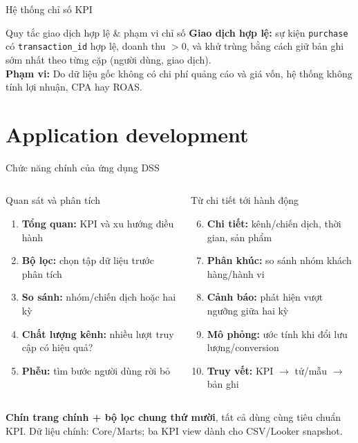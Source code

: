 \documentclass[aspectratio=169]{beamer}
\begin{document}
\begin{frame}{Hệ thống chỉ số KPI}
  \begin{alertblock}{Quy tắc giao dịch hợp lệ \& phạm vi chỉ số}
    \scriptsize
    \textbf{Giao dịch hợp lệ:} sự kiện \texttt{purchase} có \texttt{transaction\_id} hợp lệ, doanh thu $> 0$, và khử trùng bằng cách giữ bản ghi sớm nhất theo từng cặp (người dùng, giao dịch). \\
    \textbf{Phạm vi:} Do dữ liệu gốc không có chi phí quảng cáo và giá vốn, hệ thống không tính lợi nhuận, CPA hay ROAS.
  \end{alertblock}
\end{frame}

\section{Application development}

\begin{frame}{Chức năng chính của ứng dụng DSS}
  \small
  \begin{columns}[T,onlytextwidth]
    \begin{block}{Quan sát và phân tích}
      \scriptsize
      \begin{enumerate}
        \item \textbf{Tổng quan:} KPI và xu hướng điều hành
        \item \textbf{Bộ lọc:} chọn tập dữ liệu trước phân tích
        \item \textbf{So sánh:} nhóm/chiến dịch hoặc hai kỳ
        \item \textbf{Chất lượng kênh:} nhiều lượt truy cập có hiệu quả?
        \item \textbf{Phễu:} tìm bước người dùng rời bỏ
      \end{enumerate}
    \end{block}
    \begin{block}{Từ chi tiết tới hành động}
      \scriptsize
      \begin{enumerate}\setcounter{enumi}{5}
        \item \textbf{Chi tiết:} kênh/chiến dịch, thời gian, sản phẩm
        \item \textbf{Phân khúc:} so sánh nhóm khách hàng/hành vi
        \item \textbf{Cảnh báo:} phát hiện vượt ngưỡng giữa hai kỳ
        \item \textbf{Mô phỏng:} ước tính khi đổi lưu lượng/conversion
        \item \textbf{Truy vết:} KPI $\rightarrow$ tử/mẫu $\rightarrow$ bản ghi
      \end{enumerate}
    \end{block}
  \end{columns}
  \begin{flushleft}
    \small
    \textbf{Chín trang chính + bộ lọc chung thứ mười}, tất cả dùng cùng tiêu chuẩn KPI.
    Dữ liệu chính: Core/Marts; ba KPI view dành cho CSV/Looker snapshot.
  \end{flushleft}
\end{frame}
\end{document}
